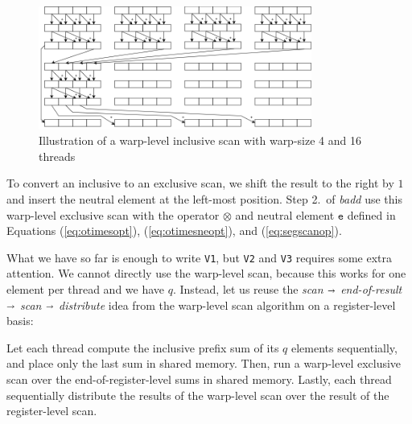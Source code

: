 \begin{figure}
  \centering
  \includegraphics[width=0.8\textwidth]{img/warp-level-scan.png}
  \caption{\footnotesize Illustration of a warp-level inclusive scan with warp-size 4 and 16 threads}
  \label{fig:warpscan}
\end{figure}

To convert an inclusive to an exclusive scan, we shift the result to the right
by $1$ and insert the neutral element at the left-most position. Step 2.\ of
\textit{badd} use this warp-level exclusive scan with the operator $\otimes$ and
neutral element $\mathtt{e}$ defined in Equations (\ref{eq:otimesopt}),
(\ref{eq:otimesneopt}), and (\ref{eq:segscanop}).

What we have so far is enough to write \texttt{V1}, but \texttt{V2} and
\texttt{V3} requires some extra attention. We cannot directly use the warp-level
scan, because this works for one element per thread and we have $q$. Instead,
let us reuse the \textit{scan} $\shortrightarrow$ \textit{end-of-result}
$\shortrightarrow$ \textit{scan} $\shortrightarrow$ \textit{distribute} idea
from the warp-level scan algorithm on a register-level basis:

Let each thread compute the inclusive prefix sum of its $q$ elements
sequentially, and place only the last sum in shared memory. Then, run a
warp-level exclusive scan over the end-of-register-level sums in shared
memory. Lastly, each thread sequentially distribute the results of the
warp-level scan over the result of the register-level scan.

